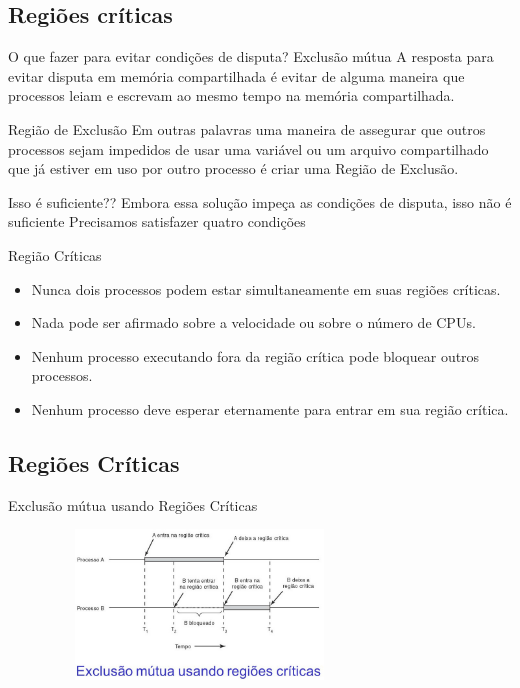 \documentclass[11pt]{beamer}
\begin{document}
\subsection*{Regiões críticas}
  
\begin{frame}{ O que fazer para evitar condições de disputa? Exclusão mútua}
 A resposta para evitar disputa em memória compartilhada é evitar de alguma maneira que processos leiam e escrevam ao mesmo tempo na memória 
 compartilhada.
 \begin{block}{ Região de Exclusão}
 Em outras palavras uma maneira de assegurar que outros processos sejam impedidos de usar uma variável ou um arquivo compartilhado 
 que já estiver em uso por outro processo é criar uma Região de Exclusão.
 \end{block}

\end{frame}

\begin{frame}{ Isso é suficiente??}
 Embora essa solução impeça as condições de disputa, isso não é suficiente
 Precisamos satisfazer quatro condições
 \begin{block}{ Região Críticas}
 \begin{itemize}
  \item Nunca dois processos podem estar simultaneamente em suas regiões críticas.
  \pause
  \item Nada pode ser afirmado sobre a velocidade ou sobre o número de CPUs.
  \pause
  \item Nenhum processo executando fora da região crítica pode bloquear outros processos.
  \pause
  \item Nenhum processo deve esperar eternamente para entrar em sua região crítica.
 \end{itemize}
 \end{block}

\end{frame}

\subsection*{ Regiões Críticas}
\begin{frame}{ Exclusão mútua usando Regiões Críticas}
  
 \begin{figure}[h]
  \includegraphics[width=80mm, height=40mm]{Figuras/exlcusaomutua}
  \end{figure}

\end{frame}
\end{document}
